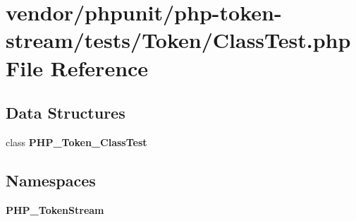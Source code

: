 \section{vendor/phpunit/php-\/token-\/stream/tests/\+Token/\+Class\+Test.php File Reference}
\label{phpunit_2php-token-stream_2tests_2_token_2_class_test_8php}
\subsection*{Data Structures}
\begin{DoxyCompactItemize}
\item 
class {\bf P\+H\+P\+\_\+\+Token\+\_\+\+Class\+Test}
\end{DoxyCompactItemize}
\subsection*{Namespaces}
\begin{DoxyCompactItemize}
\item 
 {\bf P\+H\+P\+\_\+\+Token\+Stream}
\end{DoxyCompactItemize}
